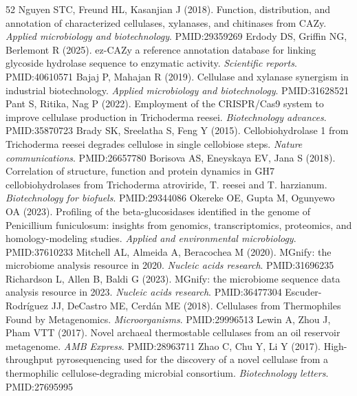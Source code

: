 \documentclass[11pt]{article}
\begin{document}
\begin{thebibliography}{52}\small
\setlength{\itemsep}{1.5pt}
 Nguyen STC, Freund HL, Kasanjian J (2018). Function, distribution, and annotation of characterized cellulases, xylanases, and chitinases from CAZy. \textit{Applied microbiology and biotechnology}. PMID:29359269
 Erdody DS, Griffin NG, Berlemont R (2025). ez-CAZy a reference annotation database for linking glycoside hydrolase sequence to enzymatic activity. \textit{Scientific reports}. PMID:40610571
 Bajaj P, Mahajan R (2019). Cellulase and xylanase synergism in industrial biotechnology. \textit{Applied microbiology and biotechnology}. PMID:31628521
 Pant S, Ritika, Nag P (2022). Employment of the CRISPR/Cas9 system to improve cellulase production in Trichoderma reesei. \textit{Biotechnology advances}. PMID:35870723
 Brady SK, Sreelatha S, Feng Y (2015). Cellobiohydrolase 1 from Trichoderma reesei degrades cellulose in single cellobiose steps. \textit{Nature communications}. PMID:26657780
 Borisova AS, Eneyskaya EV, Jana S (2018). Correlation of structure, function and protein dynamics in GH7 cellobiohydrolases from Trichoderma atroviride, T. reesei and T. harzianum. \textit{Biotechnology for biofuels}. PMID:29344086
 Okereke OE, Gupta M, Ogunyewo OA (2023). Profiling of the beta-glucosidases identified in the genome of Penicillium funiculosum: insights from genomics, transcriptomics, proteomics, and homology-modeling studies. \textit{Applied and environmental microbiology}. PMID:37610233
 Mitchell AL, Almeida A, Beracochea M (2020). MGnify: the microbiome analysis resource in 2020. \textit{Nucleic acids research}. PMID:31696235
 Richardson L, Allen B, Baldi G (2023). MGnify: the microbiome sequence data analysis resource in 2023. \textit{Nucleic acids research}. PMID:36477304
 Escuder-Rodr\'iguez JJ, DeCastro ME, Cerd\'an ME (2018). Cellulases from Thermophiles Found by Metagenomics. \textit{Microorganisms}. PMID:29996513
 Lewin A, Zhou J, Pham VTT (2017). Novel archaeal thermostable cellulases from an oil reservoir metagenome. \textit{AMB Express}. PMID:28963711
 Zhao C, Chu Y, Li Y (2017). High-throughput pyrosequencing used for the discovery of a novel cellulase from a thermophilic cellulose-degrading microbial consortium. \textit{Biotechnology letters}. PMID:27695995

\end{thebibliography}
\end{document}
